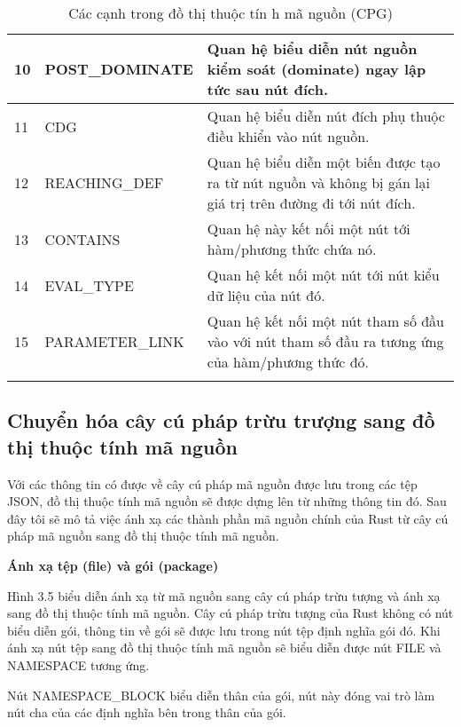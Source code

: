 \begin{longtable}{| p{} | p{} | p{} |}
10 & POST\_DOMINATE  & Quan hệ biểu diễn nút nguồn kiểm soát (dominate) ngay lập tức sau nút đích.                                                                                                                                  \\ \hline
11 & CDG            & Quan hệ biểu diễn nút đích phụ thuộc điều khiển vào nút nguồn.                                                                                                                                               \\ \hline
12 & REACHING\_DEF   & Quan hệ biểu diễn một biến được tạo ra từ nút nguồn và không bị gán lại giá trị trên đường đi tới nút đích.                                                                                                  \\ \hline
13 & CONTAINS       & Quan hệ này kết nối một nút tới hàm/phương thức chứa nó.                                                                                                                                                     \\ \hline
14 & EVAL\_TYPE      & Quan hệ kết nối một nút tới nút kiểu dữ liệu của nút đó.                                                                                                                                                     \\ \hline
15 & PARAMETER\_LINK & Quan hệ kết nối một nút tham số đầu vào với nút tham số đầu ra tương ứng của hàm/phương thức đó.                                                                                                             \\ \hline
\caption{Các cạnh trong đồ thị thuộc tín  h mã nguồn (CPG)}
\label{table:method_edgecpgjoern}
\end{longtable}
\medskip

\subsection{Chuyển hóa cây cú pháp trừu trượng sang đồ thị thuộc tính mã nguồn}

Với các thông tin có được về cây cú pháp mã nguồn được lưu trong các tệp JSON,
đồ thị thuộc tính mã nguồn sẽ được dựng lên từ những thông tin đó. Sau đây tôi sẽ mô
tả việc ánh xạ các thành phần mã nguồn chính của Rust từ cây cú pháp mã nguồn sang đồ
thị thuộc tính mã nguồn.

\textbf{Ánh xạ tệp (file) và gói (package)}

Hình 3.5 biểu diễn ánh xạ từ mã nguồn sang cây cú pháp trừu tượng và ánh xạ sang đồ thị thuộc tính mã nguồn. Cây cú pháp trừu tượng của Rust không có nút biểu diễn gói, thông tin về gói sẽ được lưu trong nút tệp định nghĩa gói đó. Khi ánh xạ nút tệp sang đồ thị thuộc tính mã nguồn sẽ biểu diễn được nút FILE và NAMESPACE tương ứng.

Nút NAMESPACE\_BLOCK biểu diễn thân của gói, nút này đóng vai trò làm nút cha của các định nghĩa bên trong thân của gói.
